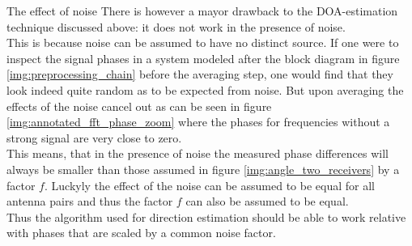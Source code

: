 \begin{subchapter}{The effect of noise}
  There is however a mayor drawback to the DOA-estimation
  technique discussed above: it does not work in the presence of noise. \\

  This is because noise can be assumed to have no distinct source.
  If one were to inspect the signal phases in a system modeled after
  the block diagram in figure \ref{img:preprocessing_chain} before
  the averaging step, one would find that they look indeed quite random
  as to be expected from noise.
  But upon averaging the effects of the noise cancel out as can be seen in figure
  \ref{img:annotated_fft_phase_zoom} where the phases for frequencies
  without a strong signal are very close to zero. \\

  This means, that in the presence of noise the measured phase differences
  will always be smaller than those assumed in figure \ref{img:angle_two_receivers}
  by a factor $f$.
  Luckyly the effect of the noise can be assumed to be equal for
  all antenna pairs and thus the factor $f$ can also be assumed to be equal. \\

  Thus the algorithm used for direction estimation
  should be able to work relative with phases that are
  scaled by a common noise factor.
\end{subchapter}

